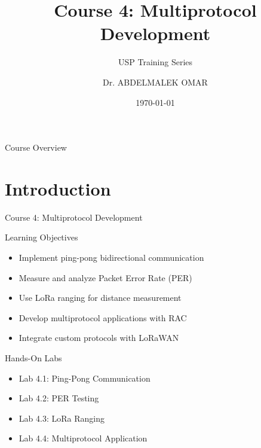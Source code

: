 \documentclass{beamer}
\title[USP Course 4: Multiprotocol]{Course 4: Multiprotocol Development}
\subtitle{USP Training Series}
\author{Dr. ABDELMALEK OMAR}
\institute{USP Zephyr Training Series\\Copyright \copyright{} 2025 Dr. ABDELMALEK OMAR}
\date{\today}
\begin{document}
\begin{frame}
\titlepage
\end{frame}

\begin{frame}{Course Overview}
\tableofcontents
\end{frame}

\section{Introduction}

\begin{frame}{Course 4: Multiprotocol Development}
\begin{block}{Learning Objectives}
\begin{itemize}
    \item Implement ping-pong bidirectional communication
    \item Measure and analyze Packet Error Rate (PER)
    \item Use LoRa ranging for distance measurement
    \item Develop multiprotocol applications with RAC
    \item Integrate custom protocols with LoRaWAN
\end{itemize}
\end{block}

\vspace{0.5cm}

\begin{block}{Hands-On Labs}
\begin{itemize}
    \item Lab 4.1: Ping-Pong Communication
    \item Lab 4.2: PER Testing
    \item Lab 4.3: LoRa Ranging
    \item Lab 4.4: Multiprotocol Application
\end{itemize}
\end{block}
\end{frame}
\end{document}
